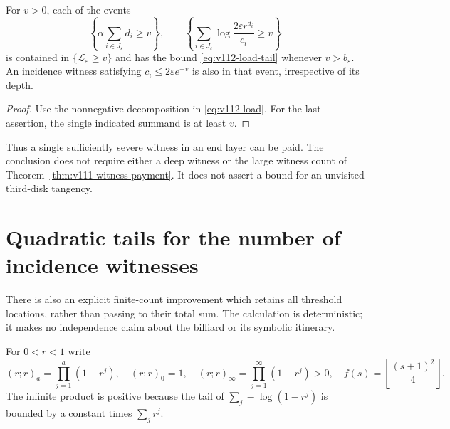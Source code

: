 \begin{corollary}
\label{cor:v112-load-consequences}
For $v>0$, each of the events
\[
 \left\{\alpha\sum_{i\in J_\varepsilon}d_i\ge v\right\},
 \qquad
 \left\{\sum_{i\in J_\varepsilon}
                  \log\frac{2\varepsilon r^{d_i}}{c_i}\ge v\right\}
\]
is contained in $\{\mathscr L_\varepsilon\ge v\}$ and has the
bound \eqref{eq:v112-load-tail} whenever $v>b_\varepsilon$.
An incidence witness satisfying $c_i\le2\varepsilon e^{-v}$ is
also in that event, irrespective of its depth.
\end{corollary}
\begin{proof}
Use the nonnegative decomposition in \eqref{eq:v112-load}. For the
last assertion, the single indicated summand is at least $v$.
\end{proof}
Thus a single sufficiently severe witness in an end layer can be
paid. The conclusion does not require either a deep witness or the
large witness count of Theorem~\ref{thm:v111-witness-payment}.
It does not assert a bound for an unvisited third-disk tangency.

\section{Quadratic tails for the number of incidence witnesses}
\label{sec:v112-count}
There is also an explicit finite-count improvement which retains
all threshold locations, rather than passing to their total sum.
The calculation is deterministic; it makes no independence claim
about the billiard or its symbolic itinerary.

For $0<r<1$ write
\[
 (r;r)_a=\prod_{j=1}^a(1-r^j),\quad (r;r)_0=1,
 \quad (r;r)_\infty=\prod_{j=1}^\infty(1-r^j)>0,
 \quad f(s)=\left\lfloor\frac{(s+1)^2}{4}\right\rfloor.
\]
The infinite product is positive because the tail of
$\sum_j-\log(1-r^j)$ is bounded by a constant times $\sum_jr^j$.

